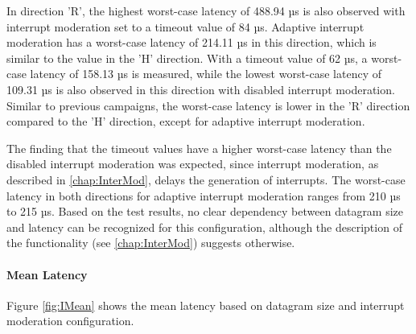 In direction 'R', the highest worst-case latency of 488.94 µs is also observed with interrupt moderation set to a timeout value of 84 µs. Adaptive interrupt moderation has a worst-case latency of 214.11 µs in this direction, which is similar to the value in the 'H' direction. With a timeout value of 62 µs, a worst-case latency of 158.13 µs is measured, while the lowest worst-case latency of 109.31 µs is also observed in this direction with disabled interrupt moderation. Similar to previous campaigns, the worst-case latency is lower in the 'R' direction compared to the 'H' direction, except for adaptive interrupt moderation.

The finding that the timeout values have a higher worst-case latency than the disabled interrupt moderation was expected, since interrupt moderation, as described in \ref{chap:InterMod}, delays the generation of interrupts.  The worst-case latency in both directions for adaptive interrupt moderation ranges from 210 µs to 215 µs. Based on the test results, no clear dependency between datagram size and latency can be recognized for this configuration, although the description of the functionality (see \ref{chap:InterMod}) suggests otherwise.

\paragraph{Mean Latency}

Figure \ref{fig:IMean} shows the mean latency based on datagram size and interrupt moderation configuration.

